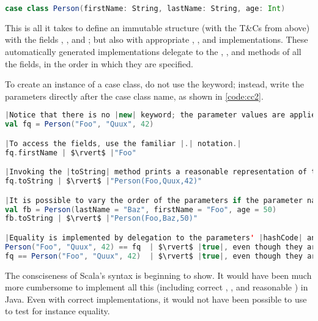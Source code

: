 \documentclass[10 pt]{article}
\begin{document}
\begin{lstlisting}[caption={Case class \pcode{Person}}, label={code:cc1}, language=Scala, escapechar=|]
case class Person(firstName: String, lastName: String, age: Int)
\end{lstlisting}

This is all it takes to define an immutable structure (with the T\&Cs from above) with the fields , , and ; but also with appropriate , , and  implementations. These automatically generated implementations delegate to the , , and  methods of all the fields, in the order in which they are specified.

To create an instance of a case class, do not use the  keyword; instead, write the parameters directly after the case class name, as shown in \autoref{code:cc2}.

\begin{lstlisting}[caption={Using case class \pcode{Person}}, label={code:cc2}, language=Scala, escapechar=|]
|Notice that there is no |new| keyword; the parameter values are applied directly after the case class name.|
val fq = Person("Foo", "Quux", 42)

|To access the fields, use the familiar |.| notation.|
fq.firstName | $\rvert$ |"Foo"

|Invoking the |toString| method prints a reasonable representation of the case class.|
fq.toString | $\rvert$ |"Person(Foo,Quux,42)"

|It is possible to vary the order of the parameters if the parameter names are also specified. This can help readability.|
val fb = Person(lastName = "Baz", firstName = "Foo", age = 50)
fb.toString | $\rvert$ |"Person(Foo,Baz,50)"

|Equality is implemented by delegation to the parameters' |hashCode| and |equals| methods.|
Person("Foo", "Quux", 42) == fq  | $\rvert$ |true|, even though they are \emph{different} instances.|
fq == Person("Foo", "Quux", 42)  | $\rvert$ |true|, even though they are \emph{different} instances.|
\end{lstlisting}

The consciseness of Scala's syntax is beginning to show. It would have been much more cumbersome to implement all this (including correct , , and reasonable ) in Java. Even with correct implementations, it would not have been possible to use \pcode{==} to test for instance equality. 
\end{document}
